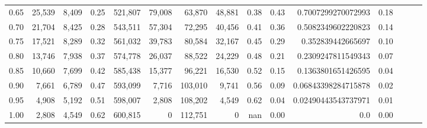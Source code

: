 \begin{tabular}{rrrrrrrrrrrrrrr}
0.65 &  25,539 &  8,409 &  0.25 &  521,807 &   79,008 &   63,870 &   48,881 &  0.38 &  0.43 &   0.7007299270072993 &      0.18 \\
0.70 &  21,704 &  8,425 &  0.28 &  543,511 &   57,304 &   72,295 &   40,456 &  0.41 &  0.36 &   0.5082349602220823 &      0.14 \\
0.75 &  17,521 &  8,289 &  0.32 &  561,032 &   39,783 &   80,584 &   32,167 &  0.45 &  0.29 &    0.352839442665697 &      0.10 \\
0.80 &  13,746 &  7,938 &  0.37 &  574,778 &   26,037 &   88,522 &   24,229 &  0.48 &  0.21 &   0.2309247811549343 &      0.07 \\
0.85 &  10,660 &  7,699 &  0.42 &  585,438 &   15,377 &   96,221 &   16,530 &  0.52 &  0.15 &   0.1363801651426595 &      0.04 \\
0.90 &   7,661 &  6,789 &  0.47 &  593,099 &    7,716 &  103,010 &    9,741 &  0.56 &  0.09 &  0.06843398284715878 &      0.02 \\
0.95 &   4,908 &  5,192 &  0.51 &  598,007 &    2,808 &  108,202 &    4,549 &  0.62 &  0.04 &  0.02490443543737971 &      0.01 \\
1.00 &   2,808 &  4,549 &  0.62 &  600,815 &        0 &  112,751 &        0 &   nan &  0.00 &                  0.0 &      0.00 \\
\bottomrule
\end{tabular}
